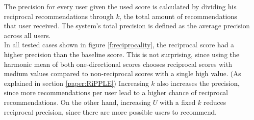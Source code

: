 \documentclass[conference]{IEEEtran}
\begin{document}
The precision for every user given the used score is calculated by dividing his reciprocal recommendations through \(k\), the total amount of recommendations that user received. The system's total precision is defined as the average precision across all users. \cite{prabhakar2017reciprocal}\\ 
In all tested cases shown in figure \ref{f:reciprocality}, the reciprocal score had a higher precision than the baseline score. This is not surprising, since using the harmonic mean of both one-directional scores chooses reciprocal scores with medium values compared to non-reciprocal scores with a single high value. (As explained in section \ref{paper:RiPPLE}) Increasing \(k\) also increases the precision, since more recommendations per user lead to a higher chance of reciprocal recommendations. On the other hand, increasing \(U\) with a fixed \(k\) reduces reciprocal precision, since there are more possible users to recommend.\\
\end{document}
